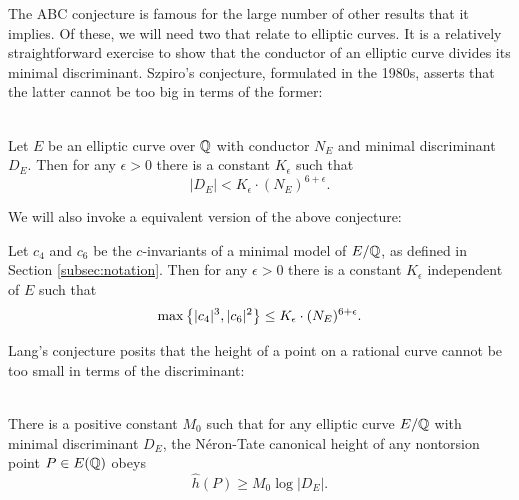 The ABC conjecture is famous for the large number of other results that it implies. Of these, we will need two that relate to elliptic curves. It is a relatively straightforward exercise to show that the conductor of an elliptic curve divides its minimal discriminant. Szpiro's conjecture, formulated in the 1980s, asserts that the latter cannot be too big in terms of the former:
\begin{conjecture}[Szpiro] \cite{szp-1987}
\label{conj:Szpiro} \\
Let $E$ be an elliptic curve over $\mathbb{Q}$ with conductor $N_E$ and minimal discriminant $D_E$. Then for any $\epsilon > 0$ there is a constant $K_{\epsilon}$ such that
\begin{equation}
|D_E| < K_{\epsilon}\cdot (N_E)^{6+\epsilon}.
\end{equation}
\end{conjecture}

We will also invoke a equivalent version of the above conjecture:
\begin{conjecture}\label{conj:modified_szpiro}
Let $c_4$ and $c_6$ be the $c$-invariants of a minimal model of $E/\mathbb{Q}$, as defined in Section \ref{subsec:notation}. Then for any $\epsilon>0$ there is a constant $K_{\epsilon}$ independent of $E$ such that
\begin{equation}
\max\left\{|c_4|^3,|c_6|^2\right\} \le K_{\epsilon}\cdot (N_E)^{6+\epsilon}.
\end{equation}
\end{conjecture}

Lang's conjecture posits that the height of a point on a rational curve cannot be too small in terms of the discriminant:
\begin{conjecture}[Lang] \cite[pp. 73-74]{Lang-1997}
\label{conj:Lang} \\
There is a positive constant $M_0$ such that for any elliptic curve $E/\mathbb{Q}$ with minimal discriminant $D_E$, the N\'{e}ron-Tate canonical height of any nontorsion point $P\in E(\mathbb{Q})$ obeys
\begin{equation}
\hat{h}(P) \ge M_0\log |D_E|.
\end{equation}
\end{conjecture}

